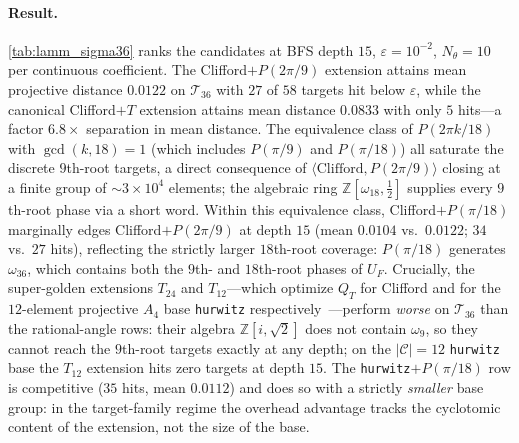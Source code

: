 \documentclass[twocolumn,superscriptaddress,showpacs,nofootinbib,notitlepage,preprintnumbers,secnumarabic,amssymb, nobibnotes, aps, prd]{revtex4-2}
\newcommand{\QT}{Q_{T}}              %
\begin{document}
\paragraph*{Result.}
\cref{tab:lamm_sigma36} ranks the candidates at BFS depth $15$, $\varepsilon = 10^{-2}$, $N_\theta = 10$ per continuous coefficient. The Clifford$+P(2\pi/9)$ extension attains mean projective distance $0.0122$ on $\mathcal{T}_{36}$ with $27$ of $58$ targets hit below $\varepsilon$, while the canonical Clifford$+T$ extension attains mean distance $0.0833$ with only $5$ hits---a factor $6.8\times$ separation in mean distance. The equivalence class of $P(2\pi k/18)$ with $\gcd(k,18)=1$ (which includes $P(\pi/9)$ and $P(\pi/18)$) all saturate the discrete $9$th-root targets, a direct consequence of $\langle \mathrm{Clifford}, P(2\pi/9)\rangle$ closing at a finite group of $\sim\! 3\times 10^4$ elements; the algebraic ring $\mathbb{Z}[\omega_{18}, \tfrac{1}{2}]$ supplies every $9$th-root phase via a short word. Within this equivalence class, Clifford$+P(\pi/18)$ marginally edges Clifford$+P(2\pi/9)$ at depth $15$ (mean $0.0104$ vs.\ $0.0122$; $34$ vs.\ $27$ hits), reflecting the strictly larger $18$th-root coverage: $P(\pi/18)$ generates $\omega_{36}$, which contains both the $9$th- and $18$th-root phases of $U_F$. Crucially, the super-golden extensions $T_{24}$ and $T_{12}$---which optimize $\QT$ for Clifford and for the $12$-element projective $A_4$ base \texttt{hurwitz} respectively~\cite{Sarnak:2015}---perform \emph{worse} on $\mathcal{T}_{36}$ than the rational-angle rows: their algebra $\mathbb{Z}[i,\sqrt{2}]$ does not contain $\omega_9$, so they cannot reach the $9$th-root targets exactly at any depth; on the $|\mathcal{C}|=12$ \texttt{hurwitz} base the $T_{12}$ extension hits zero targets at depth $15$. The \texttt{hurwitz}$+P(\pi/18)$ row is competitive ($35$ hits, mean $0.0112$) and does so with a strictly \emph{smaller} base group: in the target-family regime the overhead advantage tracks the cyclotomic content of the extension, not the size of the base.
\end{document}
